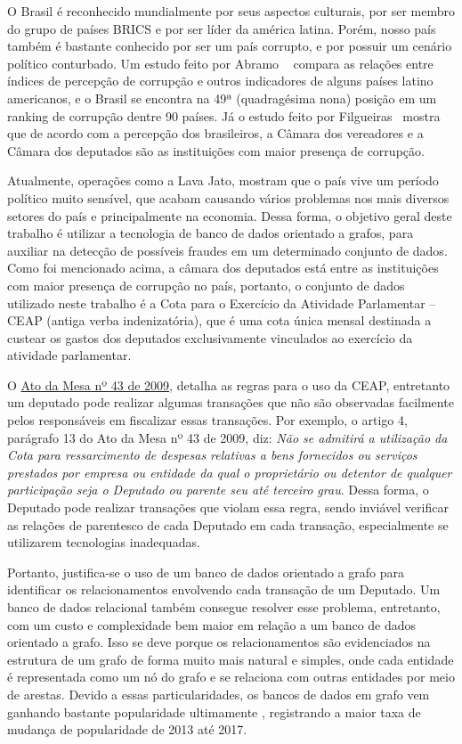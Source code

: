 \label{chap:1}

	O Brasil é reconhecido mundialmente por seus aspectos culturais, por ser membro do grupo de países BRICS e por ser líder da américa latina. Porém, nosso país também é bastante conhecido por ser um país corrupto, e por possuir um cenário político conturbado. Um estudo feito por Abramo ~\cite{abramo2000relaccoes} compara as relações entre índices de percepção de corrupção e outros indicadores de alguns países latino americanos, e o Brasil se encontra na 49ª (quadragésima nona) posição em um ranking de corrupção dentre 90 países. Já o estudo feito por Filgueiras~\cite{filgueiras2009tolerancia} mostra que de acordo com a percepção dos brasileiros, a Câmara dos vereadores e a Câmara dos deputados são as instituições com maior presença de corrupção. 
	
	Atualmente, operações como a Lava Jato, mostram que o país vive um período político muito sensível, que acabam causando vários problemas nos mais diversos setores do país e principalmente na economia. Dessa forma, o objetivo geral deste trabalho é utilizar a tecnologia de banco de dados orientado a grafos, para auxiliar na detecção de possíveis fraudes em um determinado conjunto de dados. Como foi mencionado acima, a câmara dos deputados está entre as instituições com maior presença de corrupção no país, portanto, o conjunto de dados utilizado neste trabalho é a Cota para o Exercício da Atividade Parlamentar – CEAP (antiga verba indenizatória), que é uma cota única mensal destinada a custear os gastos dos deputados exclusivamente vinculados ao exercício da atividade parlamentar.
	
	O \href{http://www2.camara.leg.br/legin/int/atomes/2009/atodamesa-43-21-maio-2009-588364-norma-cd-mesa.html}{Ato da Mesa nº 43 de 2009}, detalha as regras para o uso da CEAP, entretanto um deputado pode realizar algumas transações que não são observadas facilmente pelos responsáveis em fiscalizar essas transações. Por exemplo, o artigo 4, parágrafo 13 do Ato da Mesa nº 43 de 2009, diz: \textit{Não se admitirá a utilização da Cota para ressarcimento de despesas relativas  a bens fornecidos ou serviços prestados por empresa ou entidade da qual o proprietário ou detentor de qualquer participação seja o Deputado ou parente seu até terceiro grau}. Dessa forma, o Deputado pode realizar transações que violam essa regra, sendo inviável verificar as relações de parentesco de cada Deputado em cada transação, especialmente se utilizarem tecnologias inadequadas.
	
	Portanto, justifica-se o uso de um banco de dados orientado a grafo para identificar os relacionamentos envolvendo cada transação de um Deputado. Um banco de dados relacional também consegue resolver esse problema, entretanto, com um custo e complexidade bem maior em relação a um banco de dados orientado a grafo. Isso se deve porque os relacionamentos são evidenciados na estrutura de um grafo de forma muito mais natural e simples, onde cada entidade é representada como um nó do grafo e se relaciona com outras entidades por meio de arestas. Devido a essas particularidades, os bancos de dados em grafo vem ganhando bastante popularidade ultimamente \cite{Dbmspopularity}, registrando a maior taxa de mudança de popularidade de 2013 até 2017.
	
